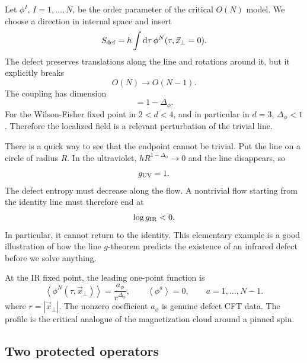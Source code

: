 \documentclass[11pt]{article}
\newcommand{\dd}{\mathrm{d}}
\newcommand{\vev}[1]{\left\langle #1\right\rangle}
\begin{document}
Let $\phi^I$, $I=1,\dots,N$, be the order parameter of the critical $O(N)$
model.  We choose a direction in internal space and insert
\begin{equation}
  S_{\rm def}=h\int \dd\tau\, \phi^N(\tau,\vec x_\perp=0) .
  \label{eq:pinningfield}
\end{equation}
The defect preserves translations along the line and rotations around it, but
it explicitly breaks
\begin{equation}
  O(N)\longrightarrow O(N-1) .
\end{equation}
The coupling has dimension
\begin{equation}
  [h]=1-\Delta_\phi .
\end{equation}
For the Wilson-Fisher fixed point in $2<d<4$, and in particular in $d=3$,
$\Delta_\phi<1$.  Therefore the localized field is a relevant perturbation of
the trivial line.

There is a quick way to see that the endpoint cannot be trivial.  Put the line
on a circle of radius $R$.  In the ultraviolet, $hR^{1-\Delta_\phi}\to0$ and
the line disappears, so
\begin{equation}
  g_{\rm UV}=1 .
\end{equation}
The defect entropy must decrease along the flow.  A nontrivial flow starting
from the identity line must therefore end at
\begin{equation}
  \log g_{\rm IR}<0 .
\end{equation}
In particular, it cannot return to the identity.  This elementary example is
a good illustration of how the line $g$-theorem predicts the existence of an
infrared defect before we solve anything.

At the IR fixed point, the leading one-point function is
\begin{equation}
  \vev{\phi^N(\tau,\vec x_\perp)}=\frac{a_\phi}{r^{\Delta_\phi}},
  \qquad
  \vev{\phi^a}=0,
  \qquad a=1,\dots,N-1 .
\end{equation}
where $r=|\vec x_\perp|$.  The nonzero coefficient $a_\phi$ is genuine defect
CFT data.  The profile is the critical analogue of the magnetization cloud
around a pinned spin.

\subsection{Two protected operators}
\end{document}
